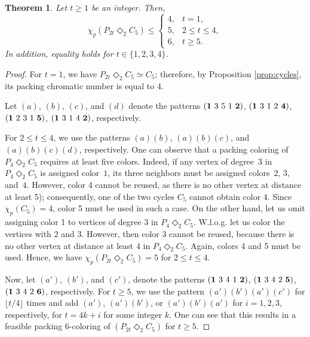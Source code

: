 \documentclass{article}
\newtheorem{theorem}{Theorem}
\begin{document}
\begin{theorem} Let $t \geq 1$ be an integer. Then,
      $$\chi_p(P_{2t} \Diamond_2 C_5) \leq \left \{
    \begin{array}{ll}
4, & t=1,\\
5, & 2 \leq t\leq 4,\\
6, & t \geq 5.
\end{array}\right.
    $$
In addition, equality holds for $t\in \{1,2,3,4\}$.
\end{theorem}
\begin{proof}
For $t=1$, we have $P_{2t}\Diamond_2 C_5 \simeq C_5$; therefore, by Proposition \ref{prop:cycles}, its packing chromatic number is equal to 4.

\noindent Let $(a)$, $(b)$, $(c)$, and $(d)$ denote the patterns $({\bf 1}\ 3\ 5\ 1\ {\bf 2})$, $({\bf 1}\ 3\ 1\ 2\ {\bf 4})$, $({\bf 1}\ 2\ 3\ 1\ {\bf 5})$, $({\bf 1}\ 3\ 1\ 4\ {\bf 2})$, respectively. 

\noindent For $2 \leq t \leq 4$, we use the patterns $(a)(b)$, $(a)(b)(c)$, and $(a)(b)(c)(d)$, respectively. One can observe that a packing coloring of $P_{4} \Diamond_2 C_{5}$ requires at least five colors. Indeed, if any vertex of degree~$3$ in $P_4 \Diamond_2 C_5$ is assigned color~$1$, its three neighbors must be assigned colors~$2$, $3$, and~$4$. However, color 4 cannot be reused, as there is no other vertex at distance at least 5); consequently, one of the two cycles $C_5$ cannot obtain color 4.  Since $\chi_p(C_5)=4$, color 5 must be used in such a case. On the other hand, let us omit assigning color 1 to vertices of degree 3 in $P_4 \Diamond_2 C_5$. W.l.o.g. let us color the vertices with 2 and 3. However, then color 3 cannot be reused, because there is no other vertex at distance at least 4 in $P_4 \Diamond_2 C_5$. Again, colors 4 and 5 must be used. Hence, we have $\chi_p(P_{2t} \Diamond_2 C_5)=5$ for $2\leq t \leq 4$.    

\noindent Now, let $(a')$, $(b')$, and $(c')$, denote the patterns $({\bf 1}\ 3\ 4\ 1\ {\bf 2})$, $({\bf 1}\ 3\ 4\ 2\ {\bf 5})$, $({\bf 1}\ 3\ 4\ 2\ {\bf 6})$, respectively. For $t \geq 5$, we use the pattern $(a')(b')(a')(c')$ for $\lfloor t/4\rfloor $ times and add $(a')$, $(a')(b')$, or $(a')(b')(a')$ for $i = 1, 2, 3$, respectively, for $t = 4k + i$ for some integer $k$. One can see that this results in a feasible packing $6$-coloring of $(P_{2t} \Diamond_2 C_5)$ for $t \geq 5$.

\end{proof}
\end{document}
